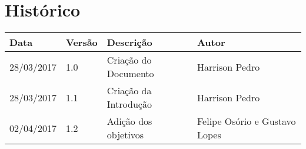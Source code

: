 \chapter{Histórico}

\begin{tabular}{ |p{3cm}|p{3cm}|p{3cm}|p{3cm}|  }
 \hline
 Data 		& 		Versão & 		Descrição 			& 		Autor\\
 \hline\hline
 28/03/2017 & 		1.0    &		Criação do Documento &   	Harrison Pedro	  \\
 \hline
 28/03/2017 & 		1.1    &		Criação da Introdução &   	Harrison Pedro	  \\
 \hline
 02/04/2017 & 		1.2    &		Adição dos objetivos &   	Felipe Osório e Gustavo Lopes	  \\
 \hline
\end{tabular}

